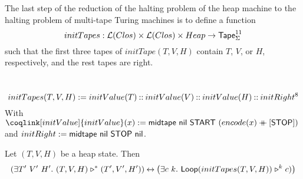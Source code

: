 The last step of the reduction of the halting problem of the heap machine to the halting problem of multi-tape Turing machines is to define a function
\[
  initTapes : \mathcal{L}(Clos) \times \mathcal{L}(Clos) \times Heap \rightarrow \mathsf{Tape}_\Sigma^{11}
\]
such that the first three tapes of $initTape(T,V,H)$ contain $T$, $V$, or $H$, respectively, and the rest tapes are right.

\begin{definition}[$initTapes$][initTapes]
  \label{def:initTapes}
  ~
  \[
    initTapes(T,V,H) := initValue(T) \mathbin{::} initValue(V) \mathbin{::} initValue(H) \mathbin{::} initRight^8
  \]
  With $\coqlink[initValue]{initValue}(x) := \MS{midtape}~\nil~\MS{START}~(encode(x) \app [\MS{STOP}])$ and $initRight := \mathsf{midtape}~\mathsf{nil}~\mathsf{STOP}~\mathsf{nil}$.
\end{definition}

\begin{theorem}
  \label{lem:HaltingProblem}
  Let $(T,V,H)$ be a heap state.  Then
  \[
    \left(\exists T'~V'~H'.~(T,V,H) \mathrel{\triangleright}^* (T',V',H') \right) \mathbin{\leftrightarrow} \left(\exists c~k.~\mathsf{Loop}(initTapes(T,V,H)) \mathrel{\triangleright}^k c)\right)
  \]
\end{theorem}







